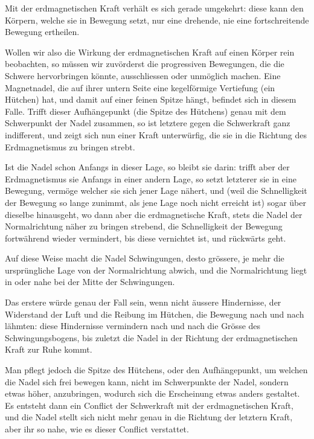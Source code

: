 \documentclass[12pt,a4paper]{article}
\begin{document}
Mit der erdmagnetischen Kraft verhält es sich gerade umgekehrt: diese kann den Körpern, welche sie in Bewegung setzt, nur eine drehende, nie eine fortschreitende Bewegung ertheilen.

Wollen wir also die Wirkung der erdmagnetischen Kraft auf einen Körper rein beobachten, so müssen wir zuvörderst die progressiven Bewegungen, die die Schwere hervorbringen könnte, ausschliessen oder unmöglich machen. Eine Magnetnadel, die auf ihrer untern Seite eine kegelförmige Vertiefung (ein Hütchen) hat, und damit auf einer feinen Spitze hängt, befindet sich in diesem Falle. Trifft dieser Aufhängepunkt (die Spitze des Hütchens) genau mit dem Schwerpunkt der Nadel zusammen, so ist letztere gegen die Schwerkraft ganz indifferent, und zeigt sich nun einer Kraft unterwürfig, die sie in die Richtung des Erdmagnetismus zu bringen strebt.

Ist die Nadel schon Anfangs in dieser Lage, so bleibt sie darin: trifft aber der Erdmagnetismus sie Anfangs in einer andern Lage, so setzt letzterer sie in eine Bewegung, vermöge welcher sie sich jener Lage nähert, und (weil die Schnelligkeit der Bewegung so lange zunimmt, als jene Lage noch nicht erreicht ist) sogar über dieselbe hinausgeht, wo dann aber die erdmagnetische Kraft, stets die Nadel der Normalrichtung näher zu bringen strebend, die Schnelligkeit der Bewegung fortwährend wieder vermindert, bis diese vernichtet ist, und rückwärts geht.

Auf diese Weise macht die Nadel Schwingungen, desto grössere, je mehr die ursprüngliche Lage von der Normalrichtung abwich, und die Normalrichtung liegt in oder nahe bei der Mitte der Schwingungen.

Das erstere würde genau der Fall sein, wenn nicht äussere Hindernisse, der Widerstand der Luft und die Reibung im Hütchen, die Bewegung nach und nach lähmten: diese Hindernisse vermindern nach und nach die Grösse des Schwingungsbogens, bis zuletzt die Nadel in der Richtung der erdmagnetischen Kraft zur Ruhe kommt.

Man pflegt jedoch die Spitze des Hütchens, oder den Aufhängepunkt, um welchen die Nadel sich frei bewegen kann, nicht im Schwerpunkte der Nadel, sondern etwas höher, anzubringen, wodurch sich die Erscheinung etwas anders gestaltet. Es entsteht dann ein Conflict der Schwerkraft mit der erdmagnetischen Kraft, und die Nadel stellt sich nicht mehr genau in die Richtung der letztern Kraft, aber ihr so nahe, wie es dieser Conflict verstattet.
\end{document}
